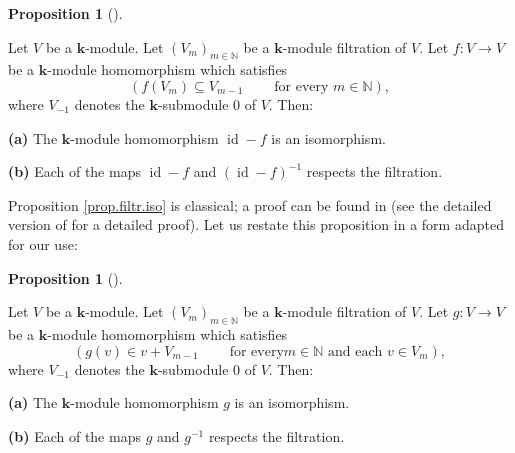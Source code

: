 \documentclass[numbers=enddot,12pt,final,onecolumn,notitlepage]{scrartcl}%
\theoremstyle{definition}
\newtheorem{prop}[theo]{Proposition}
\newenvironment{proposition}[1][]
{\begin{prop}[#1]\begin{leftbar}}
{\end{leftbar}\end{prop}}
\begin{document}
\begin{proposition}
\label{prop.filtr.iso}Let $V$ be a $\mathbf{k}$-module. Let $\left(
V_{m}\right)  _{m\in\mathbb{N}}$ be a $\mathbf{k}$-module filtration of $V$.
Let $f:V\rightarrow V$ be a $\mathbf{k}$-module homomorphism which satisfies%
\[
\left(  f\left(  V_{m}\right)  \subseteq V_{m-1}\ \ \ \ \ \ \ \ \ \ \text{for
every }m\in\mathbb{N}\right)  ,
\]
where $V_{-1}$ denotes the $\mathbf{k}$-submodule $0$ of $V$. Then:

\textbf{(a)} The $\mathbf{k}$-module homomorphism $\operatorname{id}-f$ is an isomorphism.

\textbf{(b)} Each of the maps $\operatorname{id}-f$ and $\left(
\operatorname{id}-f\right)  ^{-1}$ respects the filtration.
\end{proposition}

Proposition \ref{prop.filtr.iso} is classical; a proof can be found in
\cite[Proposition 1.99]{Grinbe11} (see the detailed version of \cite{Grinbe11}
for a detailed proof). Let us restate this proposition in a form adapted for
our use:

\begin{proposition}
\label{prop.filtr.iso-g}Let $V$ be a $\mathbf{k}$-module. Let $\left(
V_{m}\right)  _{m\in\mathbb{N}}$ be a $\mathbf{k}$-module filtration of $V$.
Let $g:V\rightarrow V$ be a $\mathbf{k}$-module homomorphism which satisfies%
\begin{equation}
\left(  g\left(  v\right)  \in v+V_{m-1}\ \ \ \ \ \ \ \ \ \ \text{for every
}m\in\mathbb{N}\text{ and each }v\in V_{m}\right)  ,
\label{eq.prop.filtr.iso-g.ass}%
\end{equation}
where $V_{-1}$ denotes the $\mathbf{k}$-submodule $0$ of $V$. Then:

\textbf{(a)} The $\mathbf{k}$-module homomorphism $g$ is an isomorphism.

\textbf{(b)} Each of the maps $g$ and $g^{-1}$ respects the filtration.
\end{proposition}
\end{document}
